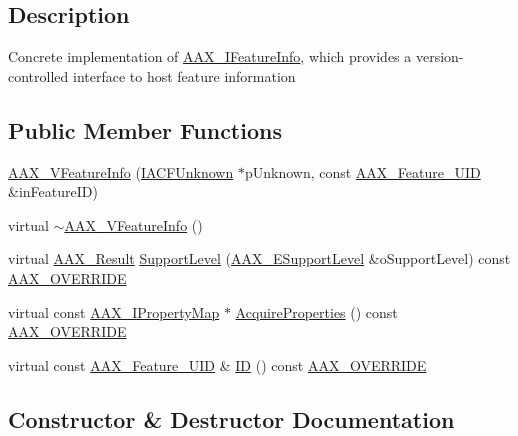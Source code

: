 \subsection{Description}
Concrete implementation of \hyperlink{a00100}{A\+A\+X\+\_\+\+I\+Feature\+Info}, which provides a version-\/controlled interface to host feature information \subsection*{Public Member Functions}
\begin{DoxyCompactItemize}
\item 
\hyperlink{a00135_a329856dcf8790714643cfd8ef73d24ba}{A\+A\+X\+\_\+\+V\+Feature\+Info} (\hyperlink{a00146}{I\+A\+C\+F\+Unknown} $\ast$p\+Unknown, const \hyperlink{a00149_a53d6cf8a08224b3e813333e411ce798e}{A\+A\+X\+\_\+\+Feature\+\_\+\+U\+I\+D} \&in\+Feature\+I\+D)
\item 
virtual \hyperlink{a00135_a6b588df1286e520a957e72575fbf4b40}{$\sim$\+A\+A\+X\+\_\+\+V\+Feature\+Info} ()
\item 
virtual \hyperlink{a00149_a4d8f69a697df7f70c3a8e9b8ee130d2f}{A\+A\+X\+\_\+\+Result} \hyperlink{a00135_ae54e05ede75acce661c80764a320a7c8}{Support\+Level} (\hyperlink{a00206_aca7bf42860665d5da66f4ac342e761b3}{A\+A\+X\+\_\+\+E\+Support\+Level} \&o\+Support\+Level) const \hyperlink{a00149_ac2f24a5172689ae684344abdcce55463}{A\+A\+X\+\_\+\+O\+V\+E\+R\+R\+I\+D\+E}
\item 
virtual const \hyperlink{a00112}{A\+A\+X\+\_\+\+I\+Property\+Map} $\ast$ \hyperlink{a00135_a7d3bce5349a7105832200c287d05c329}{Acquire\+Properties} () const \hyperlink{a00149_ac2f24a5172689ae684344abdcce55463}{A\+A\+X\+\_\+\+O\+V\+E\+R\+R\+I\+D\+E}
\item 
virtual const \hyperlink{a00149_a53d6cf8a08224b3e813333e411ce798e}{A\+A\+X\+\_\+\+Feature\+\_\+\+U\+I\+D} \& \hyperlink{a00135_a2a1b3ac1d24dcdedb477d19fbda12872}{I\+D} () const \hyperlink{a00149_ac2f24a5172689ae684344abdcce55463}{A\+A\+X\+\_\+\+O\+V\+E\+R\+R\+I\+D\+E}
\end{DoxyCompactItemize}


\subsection{Constructor \& Destructor Documentation}
\hypertarget{a00135_a329856dcf8790714643cfd8ef73d24ba}{}
